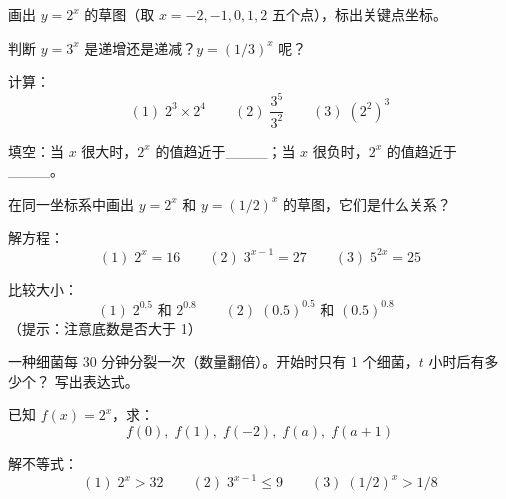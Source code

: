
\begin{exercise}[1]
画出 \(y = 2^x\) 的草图（取 \(x = -2, -1, 0, 1, 2\) 五个点），标出关键点坐标。
\end{exercise}

\begin{exercise}[1]
判断 \(y = 3^x\) 是递增还是递减？\(y = (1/3)^x\) 呢？
\end{exercise}

\begin{exercise}[1]
计算：
\[
(1)\; 2^3 \times 2^4 \qquad (2)\; \frac{3^5}{3^2} \qquad (3)\; (2^2)^3
\]
\end{exercise}

\begin{exercise}[1]
填空：当 \(x\) 很大时，\(2^x\) 的值趋近于\_\_\_\_；当 \(x\) 很负时，\(2^x\) 的值趋近于\_\_\_\_。
\end{exercise}


\begin{exercise}[2]
在同一坐标系中画出 \(y = 2^x\) 和 \(y = (1/2)^x\) 的草图，它们是什么关系？
\end{exercise}

\begin{exercise}[2]
解方程：
\[
(1)\; 2^x = 16 \qquad (2)\; 3^{x-1} = 27 \qquad (3)\; 5^{2x} = 25
\]
\end{exercise}

\begin{exercise}[2]
比较大小：
\[
(1)\; 2^{0.5} \text{ 和 } 2^{0.8} \qquad
(2)\; (0.5)^{0.5} \text{ 和 } (0.5)^{0.8} \qquad
\]
（提示：注意底数是否大于 1）
\end{exercise}

\begin{exercise}[2]
一种细菌每 30 分钟分裂一次（数量翻倍）。开始时只有 1 个细菌，\(t\) 小时后有多少个？
写出表达式。
\end{exercise}


\begin{exercise}[3]
已知 \(f(x) = 2^x\)，求：
\[
f(0),\; f(1),\; f(-2),\; f(a),\; f(a+1)
\]
\end{exercise}

\begin{exercise}[3]
解不等式：
\[
(1)\; 2^x > 32 \qquad (2)\; 3^{x-1} \le 9 \qquad (3)\; (1/2)^x > 1/8
\]
\end{exercise}


